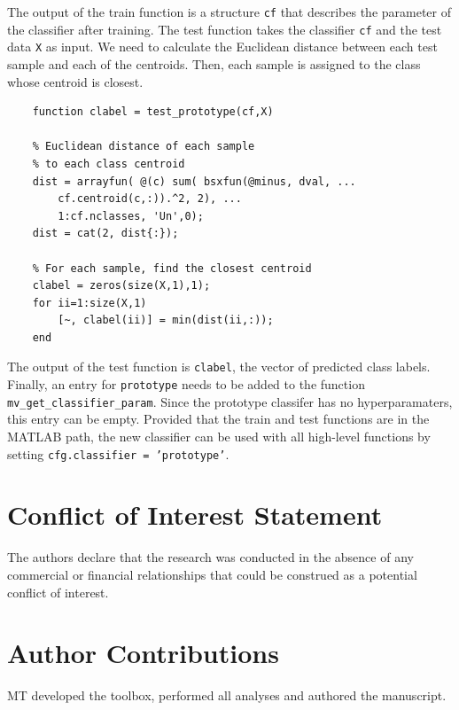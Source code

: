 \documentclass[utf8]{frontiersSCNS} %
\newcommand{\ttt}[1]{\texttt{#1}}
\begin{document}
The output of the train function is a structure \ttt{cf} that describes the parameter of the classifier after training. The test function takes the classifier \ttt{cf} and the test data \ttt{X} as input. We need to calculate the Euclidean distance between each test sample and each of the centroids. Then, each sample is assigned to the class whose centroid is closest.

\begin{verbatim}
    function clabel = test_prototype(cf,X)

    % Euclidean distance of each sample 
    % to each class centroid
    dist = arrayfun( @(c) sum( bsxfun(@minus, dval, ...
        cf.centroid(c,:)).^2, 2), ...
        1:cf.nclasses, 'Un',0);
    dist = cat(2, dist{:});

    % For each sample, find the closest centroid
    clabel = zeros(size(X,1),1);
    for ii=1:size(X,1)
        [~, clabel(ii)] = min(dist(ii,:));
    end

\end{verbatim}

The output of the test function is \ttt{clabel}, the vector of predicted class labels. Finally, an entry for \ttt{prototype} needs to be added to the function \ttt{mv\_get\_classifier\_param}. Since the prototype classifer has no hyperparamaters, this entry can be empty. Provided that the train and test functions are in the MATLAB path, the new classifier can be used with all high-level functions by setting \ttt{cfg.classifier = 'prototype'}.


\section*{Conflict of Interest Statement}

The authors declare that the research was conducted in the absence of any commercial or financial relationships that could be construed as a potential conflict of interest.

\section*{Author Contributions}

MT developed the toolbox, performed all analyses and authored the manuscript.
\end{document}
